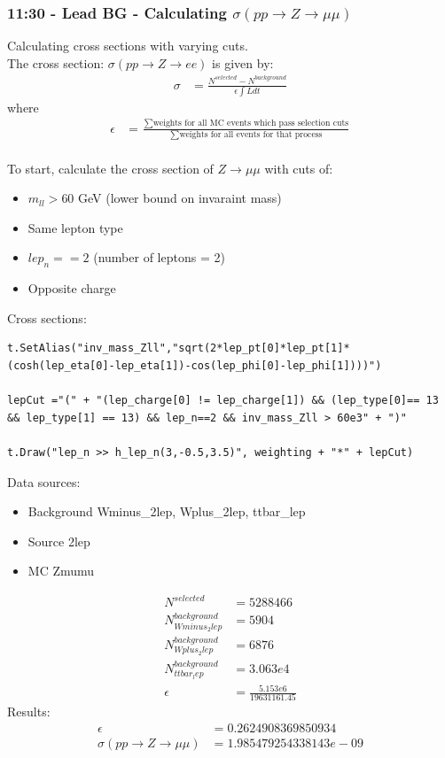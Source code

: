 \subsubsection*{11:30 - Lead BG - Calculating $\sigma(pp \rightarrow Z \rightarrow \mu\mu)$}
Calculating cross sections with varying cuts.
\\
The cross section: $\sigma (pp \rightarrow Z \rightarrow ee)$ is given by:
\begin{align}
    \sigma &= \frac{N^{selected} - N^{background}}{\epsilon \int L dt}
\end{align}
where
\begin{align}
     \epsilon &= \frac{\sum \text{weights for all MC events which pass selection cuts}}{\sum \text{weights for all events for that process}} 
\end{align}
\\
To start, calculate the cross section of $Z \rightarrow \mu\mu$ with cuts of:
\begin{itemize}
    \item $m_{ll} > 60$ GeV (lower bound on invaraint mass)
    \item Same lepton type 
    \item $lep_n == 2$ (number of leptons = 2)
    \item Opposite charge
\end{itemize}
Cross sections:
\begin{lstlisting}
t.SetAlias("inv_mass_Zll","sqrt(2*lep_pt[0]*lep_pt[1]*(cosh(lep_eta[0]-lep_eta[1])-cos(lep_phi[0]-lep_phi[1])))")
    
lepCut ="(" + "(lep_charge[0] != lep_charge[1]) && (lep_type[0]== 13 && lep_type[1] == 13) && lep_n==2 && inv_mass_Zll > 60e3" + ")"    
  
t.Draw("lep_n >> h_lep_n(3,-0.5,3.5)", weighting + "*" + lepCut)
\end{lstlisting}

Data sources: 
\begin{itemize}
    \item Background
    \subitem Wminus\_2lep, Wplus\_2lep, ttbar\_lep
    \item Source
    \subitem 2lep
    \item MC 
    \subitem Zmumu
\end{itemize}

\begin{align}
    N^{selected} &= 5288466
    \\
    N^{background}_{Wminus_2lep} &= 5904
    \\
    N^{background}_{Wplus_2lep} &= 6876
    \\
    N^{background}_{ttbar_lep} &= 3.063e4
    \\
    \epsilon &= \frac{5.153e6}{19631161.45} %
\end{align}
Results:
\begin{align}
    \epsilon &= 0.2624908369850934
    \\
    \sigma (pp \rightarrow Z \rightarrow \mu\mu) &=  1.985479254338143e-09
\end{align}



